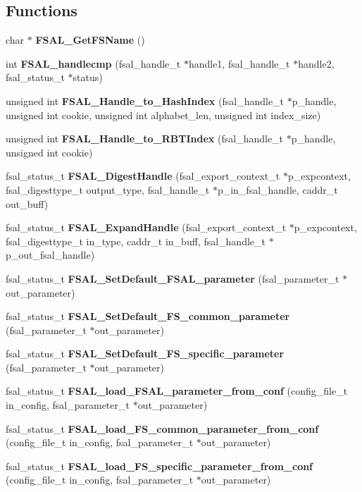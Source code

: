 \subsection*{Functions}
\begin{CompactItemize}
\item 
char $\ast$ {\bf FSAL\_\-Get\-FSName} ()\label{fsal__tools_8c_a2}

\item 
int {\bf FSAL\_\-handlecmp} (fsal\_\-handle\_\-t $\ast$handle1, fsal\_\-handle\_\-t $\ast$handle2, fsal\_\-status\_\-t $\ast$status)
\item 
unsigned int {\bf FSAL\_\-Handle\_\-to\_\-Hash\-Index} (fsal\_\-handle\_\-t $\ast$p\_\-handle, unsigned int cookie, unsigned int alphabet\_\-len, unsigned int index\_\-size)
\item 
unsigned int {\bf FSAL\_\-Handle\_\-to\_\-RBTIndex} (fsal\_\-handle\_\-t $\ast$p\_\-handle, unsigned int cookie)\label{fsal__tools_8c_a5}

\item 
fsal\_\-status\_\-t {\bf FSAL\_\-Digest\-Handle} (fsal\_\-export\_\-context\_\-t $\ast$p\_\-expcontext, fsal\_\-digesttype\_\-t output\_\-type, fsal\_\-handle\_\-t $\ast$p\_\-in\_\-fsal\_\-handle, caddr\_\-t out\_\-buff)
\item 
fsal\_\-status\_\-t {\bf FSAL\_\-Expand\-Handle} (fsal\_\-export\_\-context\_\-t $\ast$p\_\-expcontext, fsal\_\-digesttype\_\-t in\_\-type, caddr\_\-t in\_\-buff, fsal\_\-handle\_\-t $\ast$p\_\-out\_\-fsal\_\-handle)
\item 
fsal\_\-status\_\-t {\bf FSAL\_\-Set\-Default\_\-FSAL\_\-parameter} (fsal\_\-parameter\_\-t $\ast$out\_\-parameter)
\item 
fsal\_\-status\_\-t {\bf FSAL\_\-Set\-Default\_\-FS\_\-common\_\-parameter} (fsal\_\-parameter\_\-t $\ast$out\_\-parameter)\label{fsal__tools_8c_a9}

\item 
fsal\_\-status\_\-t {\bf FSAL\_\-Set\-Default\_\-FS\_\-specific\_\-parameter} (fsal\_\-parameter\_\-t $\ast$out\_\-parameter)\label{fsal__tools_8c_a10}

\item 
fsal\_\-status\_\-t {\bf FSAL\_\-load\_\-FSAL\_\-parameter\_\-from\_\-conf} (config\_\-file\_\-t in\_\-config, fsal\_\-parameter\_\-t $\ast$out\_\-parameter)
\item 
fsal\_\-status\_\-t {\bf FSAL\_\-load\_\-FS\_\-common\_\-parameter\_\-from\_\-conf} (config\_\-file\_\-t in\_\-config, fsal\_\-parameter\_\-t $\ast$out\_\-parameter)\label{fsal__tools_8c_a12}

\item 
fsal\_\-status\_\-t {\bf FSAL\_\-load\_\-FS\_\-specific\_\-parameter\_\-from\_\-conf} (config\_\-file\_\-t in\_\-config, fsal\_\-parameter\_\-t $\ast$out\_\-parameter)\label{fsal__tools_8c_a13}

\end{CompactItemize}



